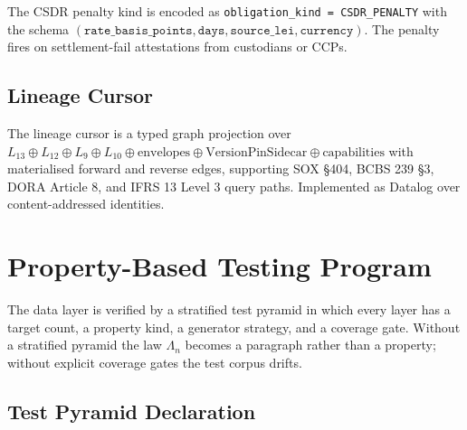 \documentclass[11pt,a4paper]{article}
\begin{document}
The CSDR penalty kind is encoded as \texttt{obligation\_kind = CSDR\_PENALTY} with the schema $(\texttt{rate\_basis\_points}, \texttt{days}, \texttt{source\_lei}, \texttt{currency})$. The penalty fires on settlement-fail attestations from custodians or CCPs.

\subsection{Lineage Cursor}
\label{sec:operational-lineage}

The lineage cursor is a typed graph projection over $L_{13} \oplus L_{12} \oplus L_9 \oplus L_{10} \oplus \text{envelopes} \oplus \text{VersionPinSidecar} \oplus \text{capabilities}$ with materialised forward and reverse edges, supporting SOX \S404, BCBS 239 \S3, DORA Article 8, and IFRS 13 Level 3 query paths. Implemented as Datalog over content-addressed identities.

\clearpage
\section{Property-Based Testing Program}
\label{sec:pbt}

The data layer is verified by a stratified test pyramid in which every layer has a target count, a property kind, a generator strategy, and a coverage gate. Without a stratified pyramid the law $\Lambda_n$ becomes a paragraph rather than a property; without explicit coverage gates the test corpus drifts.

\subsection{Test Pyramid Declaration}
\label{sec:pbt-pyramid}
\end{document}
